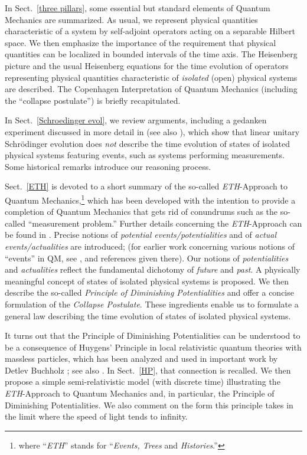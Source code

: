 \documentclass[12pt]{article}
\begin{document}
In Sect.~\ref{three pillars}, some essential but standard elements of Quantum Mechanics are summarized.
As usual, we represent physical quantities characteristic of a system by self-adjoint operators acting on a separable Hilbert
space. We then emphasize the importance of the requirement that physical quantities can be localized in bounded intervals
of the time axis. The Heisenberg picture and the usual Heisenberg equations for the time evolution of operators representing
physical quantities characteristic of \textit{isolated} (open) physical systems are described. The Copenhagen Interpretation
of Quantum Mechanics (including the ``collapse postulate'') is briefly recapitulated.

In Sect.~\ref{Schroedinger evol}, we review arguments, including a gedanken experiment discussed in more detail in
\cite{FFS} (see also \cite{Schill}), which show that linear unitary Schr\"odinger evolution does \textit{not} describe the
time evolution of states of isolated physical systems featuring events, such as systems performing measurements. Some historical remarks introduce our reasoning process.

Sect.~\ref{ETH} is devoted to a short summary of the so-called \textit{ETH}-Approach to Quantum Mechanics,\footnote{where
``\textit{ETH}'' stands for ``\textit{Events, Trees} and \textit{Histories}.''}  which has
been developed with the intention to provide a completion of Quantum Mechanics that gets rid of conundrums such
as the so-called ``measurement problem.'' Further details concerning the \textit{ETH}-Approach can be found in
\cite{F-Schub, BFS, Fr1, LMU-19, Fr2}. Precise notions of \textit{potential events/potentialities} and of
\textit{actual events/actualities} are introduced; (for earlier work concerning various notions of ``events'' in QM, see
\cite{Rudolf, Blanchard}, and references given there). Our notions of \textit{potentialities} and \textit{actualities} reflect the
fundamental dichotomy of \textit{future} and \textit{past}. A physically meaningful concept of states of isolated physical
systems is proposed. We then describe the so-called \textit{Principle of Diminishing Potentialities} and offer a concise
formulation of the \textit{Collapse Postulate}. These ingredients enable us to formulate a general law describing
the time evolution of states of isolated physical systems.

It turns out that the Principle of Diminishing Potentialities can be understood to be a consequence of Huygens' Principle in
local relativistic quantum theories with massless particles, which has been analyzed and used in important work by
{Detlev Buchholz} \cite{Buchholz}; see also \cite{BRob}. In Sect.~\ref{HP}, that connection is recalled. We then propose
a simple semi-relativistic model (with discrete time) illustrating the \textit{ETH}-Approach to Quantum Mechanics and,
in particular, the Principle of Diminishing Potentialities. We also comment on the form this principle takes in the limit
where the speed of light tends to infinity.
\end{document}
